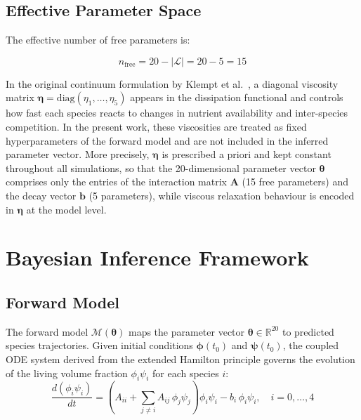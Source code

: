 \documentclass[11pt,a4paper]{article}
\begin{document}
\subsection{Effective Parameter Space}

The effective number of free parameters is:

\begin{equation}
n_{\text{free}} = 20 - |\mathcal{L}| = 20 - 5 = 15
\end{equation}

In the original continuum formulation by Klempt et al.~\cite{Klempt2025ContinuumBiofilm}, a diagonal viscosity matrix $\boldsymbol{\eta} = \mathrm{diag}(\eta_1,\dots,\eta_5)$ appears in the dissipation functional and controls how fast each species reacts to changes in nutrient availability and inter-species competition. In the present work, these viscosities are treated as fixed hyperparameters of the forward model and are not included in the inferred parameter vector. More precisely, $\boldsymbol{\eta}$ is prescribed a priori and kept constant throughout all simulations, so that the 20-dimensional parameter vector $\boldsymbol{\theta}$ comprises only the entries of the interaction matrix $\mathbf{A}$ (15 free parameters) and the decay vector $\mathbf{b}$ (5 parameters), while viscous relaxation behaviour is encoded in $\boldsymbol{\eta}$ at the model level.

\section{Bayesian Inference Framework}
\label{sec:bayesian}

\subsection{Forward Model}

The forward model $\mathcal{M}(\boldsymbol{\theta})$ maps the parameter vector $\boldsymbol{\theta} \in \mathbb{R}^{20}$ to predicted species trajectories. Given initial conditions $\boldsymbol{\phi}(t_0)$ and $\boldsymbol{\psi}(t_0)$, the coupled ODE system derived from the extended Hamilton principle \cite{JunkerBalzani2021ExtendedHamilton, Klempt2025ContinuumBiofilm} governs the evolution of the living volume fraction $\phi_i \psi_i$ for each species $i$:
\begin{equation}
\frac{d(\phi_i \psi_i)}{dt} = \left( A_{ii} + \sum_{j \neq i} A_{ij}\, \phi_j \psi_j \right) \phi_i \psi_i - b_i\, \phi_i \psi_i, \quad i = 0, \ldots, 4
\label{eq:ode}
\end{equation}
\end{document}
